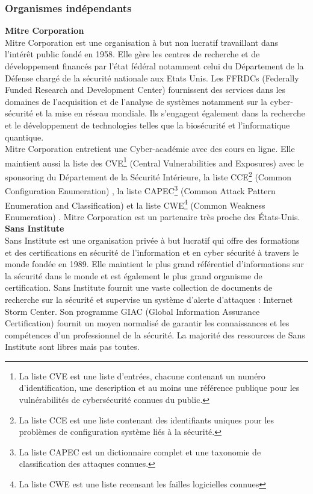 \subsubsection{Organismes indépendants}
\textbf{\RIGHTarrow Mitre Corporation}\\
Mitre Corporation est une organisation à but non lucratif travaillant dans l’intérêt public fondé en 1958. Elle gère les centres de recherche et de développement financés par l’état fédéral notamment celui du Département de la Défense chargé de la sécurité nationale aux Etats Unis. Les FFRDCs (Federally Funded Research and Development Center)  fournissent des services dans les domaines de l'acquisition et de l'analyse de systèmes notamment sur la cyber-sécurité et la mise en réseau mondiale. Ils s'engagent également dans la recherche et le développement de technologies telles que la biosécurité et l'informatique quantique.\\
Mitre Corporation entretient une Cyber-académie avec des cours en ligne. Elle maintient aussi la liste des CVE\footnote{La liste CVE est une liste d’entrées, chacune contenant un numéro d’identification, une description et au moins une référence publique pour les vulnérabilités de cybersécurité connues du public.} (Central Vulnerabilities and Exposures)  avec le sponsoring du Département de la Sécurité Intérieure, la liste CCE\footnote{La liste CCE est une liste contenant des identifiants uniques pour les problèmes de configuration système liés à la sécurité.} (Common Configuration Enumeration) , la liste CAPEC\footnote{La liste CAPEC est un dictionnaire complet et une taxonomie de classification des attaques connues.} (Common Attack Pattern Enumeration and Classification)  et la liste CWE\footnote{La liste CWE est une liste recensant les failles logicielles connues} (Common Weakness Enumeration) . Mitre Corporation est un partenaire très proche des États-Unis.\\

\textbf{\RIGHTarrow Sans Institute}\\
Sans Institute est une organisation privée à but lucratif qui offre des formations et des certifications en sécurité de l'information et en cyber sécurité à travers le monde fondée en 1989. Elle maintient le plus grand référentiel d'informations sur la sécurité dans le monde et est également le plus grand organisme de certification. Sans Institute fournit une vaste collection de documents de recherche sur la sécurité et supervise un système d’alerte d’attaques : Internet Storm Center. Son programme GIAC (Global Information Assurance Certification)  fournit un moyen normalisé de garantir les connaissances et les compétences d'un professionnel de la sécurité. La majorité des ressources de Sans Institute sont libres mais pas toutes.\\

